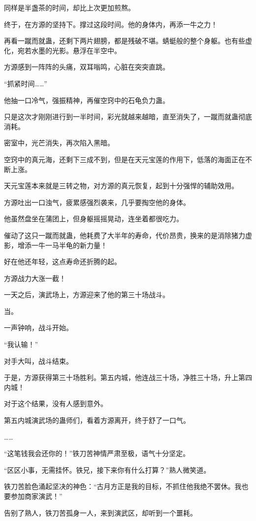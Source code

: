 \begin{this_body}
同样是半盏茶的时间，却比上次更加煎熬。

终于，在方源的坚持下。撑过这段时间。他的身体内，再添一牛之力！

再看一蹴而就蛊，还剩下两片翅膀，都是残破不堪。蜻蜓般的整个身躯。也有些虚化，宛若水墨的光影。悬浮在半空中。

方源感到一阵阵的头痛，双耳嗡鸣，心脏在突突直跳。

“抓紧时间……”

他抽一口冷气，强振精神，再催空窍中的石龟负力蛊。

只是这次才刚刚进行到一半时间，彩光就越来越暗，直至消失了，一蹴而就蛊彻底消耗。

密室中，光芒消失，再次陷入黑暗。

空窍中的真元海，还剩下三成不到，但是在天元宝莲的作用下，低落的海面正在不断上涨。

天元宝莲本来就是三转之物，对方源的真元恢复，起到十分强悍的辅助效用。

方源吐出一口浊气，疲累感强烈袭来，几乎要掏空他的身体。

他虽然盘坐在蒲团上，但身躯摇摇晃动，连坐着都很吃力。

催动了这只一蹴而就蛊，他耗费了大半年的寿命，代价昂贵，换来的是消除猪力虚影，增添一牛一马半龟的新力量！

好在他还年轻，这点寿命还折腾的起。

方源战力大涨一截！

一天之后，演武场上，方源迎来了他的第三十场战斗。

当。

一声钟响，战斗开始。

“我认输！”

对手大叫，战斗结束。

于是，方源获得第三十场胜利。第五内城，他连战三十场，净胜三十场，升上第四内城！

对于这个结果，没有人感到意外。

第五内城演武场的蛊师们，看着方源离开，终于舒了一口气。

……

“这笔钱我会还你的！”铁刀苦神情严肃至极，语气十分坚定。

“区区小事，无需挂怀。铁兄，接下来你有什么打算？”熟人微笑道。

铁刀苦脸色涌起坚决的神色：“古月方正是我的目标，不抓住他我绝不罢休。我也要参加商家演武！”

告别了熟人，铁刀苦孤身一人，来到演武区，却听到一个噩耗。


\end{this_body}
